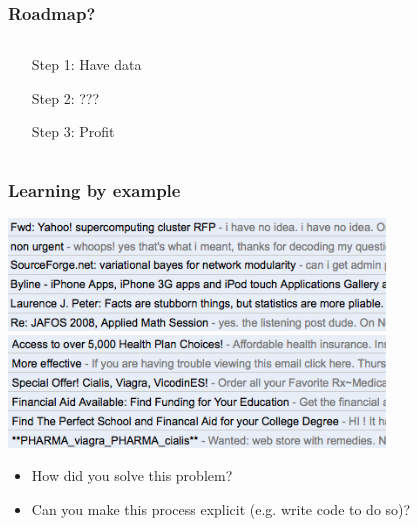 \documentclass[xcolor=dvipsnames, 9pt]{beamer}
\begin{document}
\begin{frame}
  \frametitle{Roadmap?}

  \begin{columns}



    \begin{center}
      \Huge
      \begin{enumerate}
        \item[Step 1:] Have data
        \item[Step 2:] \alert{???}
        \item[Step 3:] Profit
      \end{enumerate}
    \end{center}


  \end{columns}

\end{frame}


\begin{frame}
  \frametitle{Learning by example}

    \begin{center}
      \includegraphics[width=0.75\textwidth]{email_ham.png}
      \includegraphics[width=0.75\textwidth]{email_spam.png}
    \end{center}

    \begin{itemize}
      \pause
      \item How did you solve this problem?
      \item \alert<2>{Can you make this process explicit (e.g. write code to do so)?}
    \end{itemize}

\end{frame}
\end{document}
